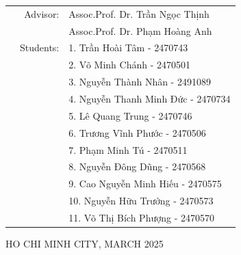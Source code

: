 \documentclass[a4paper]{article}
\begin{document}
\begin{titlepage}
\begin{table}[h]
\begin{tabular}{rrl}
\hspace{5 cm} & Advisor: & Assoc.Prof. Dr. Trần Ngọc Thịnh \\ 
&& Assoc.Prof. Dr. Phạm Hoàng Anh \\
& Students: &1. Trần Hoài Tâm - 2470743 \\
&&2. Võ Minh Chánh - 2470501 \\
&&3. Nguyễn Thành Nhân - 2491089 \\
&&4. Nguyễn Thanh Minh Đức - 2470734 \\
&&5. Lê Quang Trung - 2470746 \\
&&6. Trương Vĩnh Phước - 2470506 \\
&&7. Phạm Minh Tú - 2470511 \\
&&8. Nguyễn Đông Dũng - 2470568 \\
&&9. Cao Nguyễn Minh Hiếu - 2470575 \\
&&10. Nguyễn Hữu Trưởng - 2470573 \\
&&11. Võ Thị Bích Phượng - 2470570 \\


\end{tabular}
\end{table}

\begin{center}
{\footnotesize HO CHI MINH CITY, MARCH 2025}
\end{center}
\end{titlepage}



\newpage
\tableofcontents
\newpage

\end{document}

